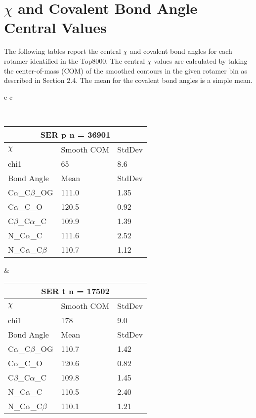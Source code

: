 \section*{$\chi$ and Covalent Bond Angle Central Values}
The following tables report the central $\chi$ and covalent bond angles for each rotamer identified in the Top8000. The central $\chi$ values are calculated by taking the center-of-mass (COM) of the smoothed contours in the given rotamer bin as described in Section 2.4. The mean for the covalent bond angles is a simple mean.


\begin{longtable}{ c c }

\caption{SER Central Values}\\
  \begin{tabular}{ l l l }
  \toprule
  \multicolumn{3}{c}{SER \textbf{p} n = 36901} \\ \toprule
  $\chi$       & Smooth COM & StdDev \\ \midrule
  chi1 & 65 & 8.6 \\ \midrule
  Bond Angle   & Mean     & StdDev \\ \midrule
  C$\alpha$\_C$\beta$\_OG & 111.0 & 1.35\\
  C$\alpha$\_C\_O & 120.5 & 0.92\\
  C$\beta$\_C$\alpha$\_C & 109.9 & 1.39\\
  N\_C$\alpha$\_C & 111.6 & 2.52\\
  N\_C$\alpha$\_C$\beta$ & 110.7 & 1.12\\
  \bottomrule
  \end{tabular}
  &
  \begin{tabular}{ l l l }
  \toprule
  \multicolumn{3}{c}{SER \textbf{t} n = 17502} \\ \toprule
  $\chi$       & Smooth COM & StdDev \\ \midrule
  chi1 & 178 & 9.0 \\ \midrule
  Bond Angle   & Mean     & StdDev \\ \midrule
  C$\alpha$\_C$\beta$\_OG & 110.7 & 1.42\\
  C$\alpha$\_C\_O & 120.6 & 0.82\\
  C$\beta$\_C$\alpha$\_C & 109.8 & 1.45\\
  N\_C$\alpha$\_C & 110.5 & 2.40\\
  N\_C$\alpha$\_C$\beta$ & 110.1 & 1.21\\
  \bottomrule
  \end{tabular}
  \\
  \begin{tabular}{ l l l }

\end{tabular}
\end{longtable}
